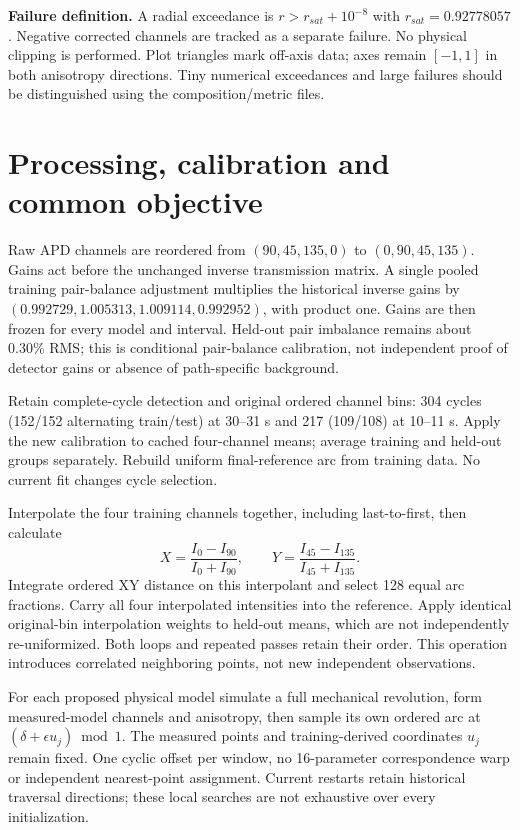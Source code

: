 \documentclass[10pt,a4paper]{article}
\begin{document}
\textbf{Failure definition.} A radial exceedance is $r>r_{sat}+10^{-8}$ with $r_{sat}=0.92778057$. Negative corrected channels are tracked as a separate failure. No physical clipping is performed. Plot triangles mark off-axis data; axes remain $[-1,1]$ in both anisotropy directions. Tiny numerical exceedances and large failures should be distinguished using the composition/metric files.

\tableofcontents
\newpage
\section{Processing, calibration and common objective}
Raw APD channels are reordered from $(90,45,135,0)$ to $(0,90,45,135)$. Gains act before the unchanged inverse transmission matrix. A single pooled training pair-balance adjustment multiplies the historical inverse gains by $(0.992729,1.005313,1.009114,0.992952)$, with product one. Gains are then frozen for every model and interval. Held-out pair imbalance remains about 0.30\% RMS; this is conditional pair-balance calibration, not independent proof of detector gains or absence of path-specific background.

Retain complete-cycle detection and original ordered channel bins: 304 cycles (152/152 alternating train/test) at 30--31 s and 217 (109/108) at 10--11 s. Apply the new calibration to cached four-channel means; average training and held-out groups separately. Rebuild uniform final-reference arc from training data. No current fit changes cycle selection.

Interpolate the four training channels together, including last-to-first, then calculate
\[
X=\frac{I_0-I_{90}}{I_0+I_{90}},\qquad Y=\frac{I_{45}-I_{135}}{I_{45}+I_{135}}.
\]
Integrate ordered XY distance on this interpolant and select 128 equal arc fractions. Carry all four interpolated intensities into the reference. Apply identical original-bin interpolation weights to held-out means, which are not independently re-uniformized. Both loops and repeated passes retain their order. This operation introduces correlated neighboring points, not new independent observations.

For each proposed physical model simulate a full mechanical revolution, form measured-model channels and anisotropy, then sample its own ordered arc at $(\delta+\epsilon u_j)\bmod1$. The measured points and training-derived coordinates $u_j$ remain fixed. One cyclic offset per window, no 16-parameter correspondence warp or independent nearest-point assignment. Current restarts retain historical traversal directions; these local searches are not exhaustive over every initialization.
\end{document}
